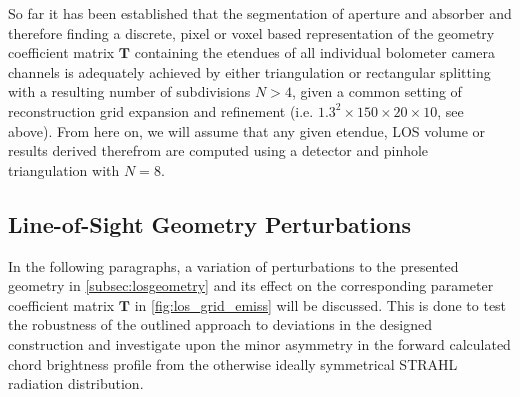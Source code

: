             So far it has been established that the segmentation of aperture and absorber and therefore finding a discrete, pixel or voxel based representation of the geometry coefficient matrix $\mathbf{T}$ containing the etendues of all individual bolometer camera channels is adequately achieved by either triangulation or rectangular splitting with a resulting number of subdivisions $N>4$, given a common setting of reconstruction grid expansion and refinement (i.e. $1.3^{2}\times150\times20\times10$, see above). From here on, we will assume that any given etendue, LOS volume or results derived therefrom are computed using a detector and pinhole triangulation with $N=8$.\\%
%
        \subsection{Line-of-Sight Geometry Perturbations}\label{subsec:geompertub}%
%
        In the following paragraphs, a variation of perturbations to the presented geometry in \cref{subsec:losgeometry} and its effect on the corresponding parameter coefficient matrix $\mathbf{T}$ in \cref{fig:los_grid_emiss} will be discussed. This is done to test the robustness of the outlined approach to deviations in the designed construction and investigate upon the minor asymmetry in the forward calculated chord brightness profile from the otherwise ideally symmetrical STRAHL radiation distribution.%
%
